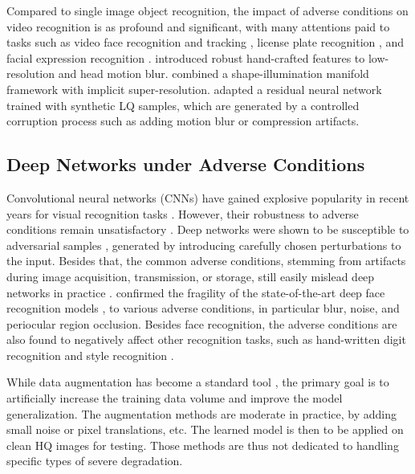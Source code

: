 \documentclass[10pt,twocolumn,twoside]{IEEEtran} %
\begin{document}
Compared to single image object recognition, the impact of adverse conditions on video recognition is as profound and significant, with many attentions paid to tasks such as video face recognition and tracking \cite{stasiak2009face}, license plate recognition \cite{chen2007license}, and facial expression recognition \cite{tian2004evaluation}. \cite{shan2005recognizing} introduced robust hand-crafted features to low-resolution and head motion blur. \cite{arandjelovic2007manifold} combined a shape-illumination manifold framework with implicit super-resolution. \cite{herrmann2016low} adapted a residual neural network trained with synthetic LQ samples, which are generated by a controlled corruption process such as adding motion blur or compression artifacts. 

\subsection{Deep Networks under Adverse Conditions}

Convolutional neural networks (CNNs) have gained explosive popularity in recent years for visual recognition tasks \cite{Alex, karpathy2014large}. However, their robustness to adverse conditions remain unsatisfactory \cite{karahan2016image}. Deep networks were shown to be susceptible to adversarial samples \cite{goodfellow2014explaining}, generated by introducing carefully chosen perturbations to the input. 
Besides that,
the common  adverse conditions, stemming from artifacts during image acquisition, transmission, or storage, still easily mislead deep networks in practice \cite{dodge2016understanding}. \cite{karahan2016image} confirmed the fragility of the state-of-the-art deep face recognition models \cite{Alex, parkhi2015deep, szegedy2015going}, to various adverse conditions, in particular blur, noise, and periocular region occlusion. 
Besides face recognition, the adverse conditions are also found to negatively affect other recognition tasks, such as hand-written digit recognition \cite{basu2015learning} and style recognition \cite{vlrr}. 

While data augmentation has become a standard tool \cite{Alex}, the primary goal is to artificially  increase the training data volume and improve the model generalization. The augmentation methods are moderate in practice, by adding small noise or pixel translations, etc. The learned model is then to be applied on clean HQ images for testing. Those methods are thus not dedicated to handling specific types of severe degradation.
\end{document}
